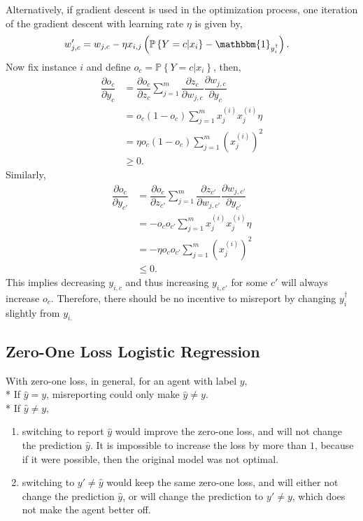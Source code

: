 \documentclass{article}
\begin{document}
Alternatively, if gradient descent is used in the optimization process, one iteration of the gradient descent with learning rate $\eta$ is given by,
\begin{align*}
w'_{j,c} &= w_{j,c} - \eta x_{i,j} \left(\mathbb{P}\left\{Y = c | x_{i}\right\} - \mathbbm{1}_{y^{\dagger}_{i}}\right).
\end{align*}
Now fix instance $i $ and define $o_{c} = \mathbb{P}\left\{Y = c | x_{i}\right\}$, then,
\begin{align*}
\dfrac{\partial o_{c}}{\partial y_{c}} &= \dfrac{\partial o_{c}}{\partial z_{c}} \displaystyle\sum_{j=1}^{m} \dfrac{\partial z_{c}}{\partial w_{j,c}} \dfrac{\partial w_{j,c}}{\partial y_{c}}
\\ &= o_{c} \left(1 - o_{c}\right) \displaystyle\sum_{j=1}^{m} x_{j}^{\left(i\right)} x_{j}^{\left(i\right)} \eta
\\ &= \eta o_{c} \left(1 - o_{c}\right) \displaystyle\sum_{j=1}^{m} \left(x_{j}^{\left(i\right)}\right)^{2}
\\ &\geq  0.
\end{align*}
Similarly,
\begin{align*}
\dfrac{\partial o_{c}}{\partial y_{c'}} &= \dfrac{\partial o_{c}}{\partial z_{c'}} \displaystyle\sum_{j=1}^{m} \dfrac{\partial z_{c'}}{\partial w_{j,c'}} \dfrac{\partial w_{j,c'}}{\partial y_{c'}}
\\ &= - o_{c} o_{c'} \displaystyle\sum_{j=1}^{m} x_{j}^{\left(i\right)} x_{j}^{\left(i\right)} \eta
\\ &= - \eta o_{c} o_{c'} \displaystyle\sum_{j=1}^{m} \left(x_{j}^{\left(i\right)}\right)^{2}
\\ &\leq  0.
\end{align*}
This implies decreasing $y_{i,c}$ and thus increasing $y_{i,c'}$ for some $c'$ will always increase $o_{c}$. Therefore, there should be no incentive to misreport by changing $y^{\dagger}_{i}$ slightly from $y_{i.}$
\newline \newline


\subsection{Zero-One Loss Logistic Regression}
With zero-one loss, in general, for an agent with label $y, $
\\* If $\hat{y} = y $, misreporting could only make $\hat{y} \neq  y$.
\\* If $\hat{y} \neq  y, $
\begin{enumerate}
\item switching to report $\hat{y}$ would improve the zero-one loss, and will not change the prediction $\hat{y}$. It is impossible to increase the loss by more than $1$, because if it were possible, then the original model was not optimal.
\item switching to $y' \neq  \hat{y}$ would keep the same zero-one loss, and will either not change the prediction $\hat{y}$, or will change the prediction to $y' \neq  y $, which does not make the agent better off.
\end{enumerate}
\end{document}
